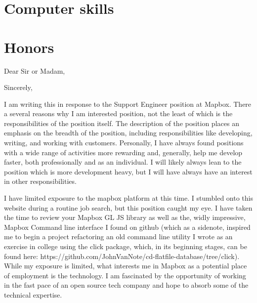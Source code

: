 \documentclass[11pt,a4paper,sans]{moderncv}        %
\begin{document}
\section{Computer skills}

\section{Honors}

\clearpage
\date{September 15, 2016}
\opening{Dear Sir or Madam,}
\closing{Sincerely,}

\makelettertitle

I am writing this in response to the Support Engineer position at Mapbox. There a several reasons why I am interested position, not the least of which is the responsibilities of the position itself. The description of the position places an emphasis on the breadth of the position, including responsibilities like developing, writing, and working with customers. Personally, I have always found positions with a wide range of activities more rewarding and, generally, help me develop faster, both professionally and as an individual. I will likely always lean to the position which is more development heavy, but I will have always have an interest in other responsibilities.

I have limited exposure to the mapbox platform at this time. I stumbled onto this website during a routine job search, but this position caught my eye. I have taken the time to review your Mapbox GL JS library as well as the, widly impressive, Mapbox Command line interface I found on github (which as a sidenote, inspired me to begin a project refactoring an old command line utility I wrote as an exercise in college using the click package, which, in its beginning stages, can be found here: https://github.com/JohnVanNote/cd-flatfile-database/tree/click). While my exposure is limited, what interests me in Mapbox as a potential place of employment is the technology. I am fascinated by the opportunity of working in the fast pace of an open source tech company and hope to absorb some of the technical expertise.
\end{document}
